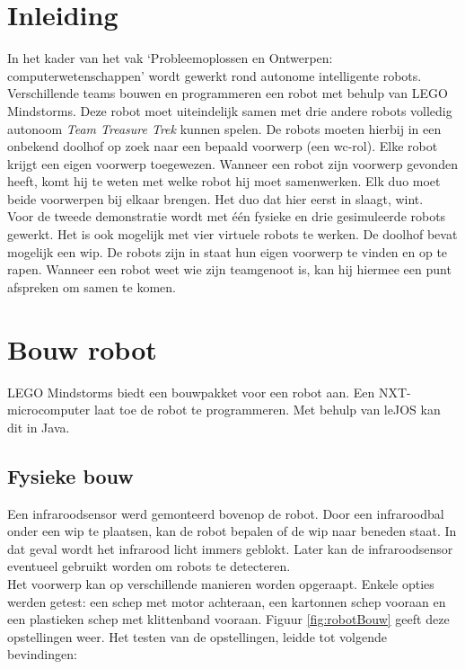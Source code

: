 \documentclass[tt2]{penoverslag}
\begin{document}
\newpage


\section{Inleiding} %
\label{ssec:inl}
In het kader van het vak `Probleemoplossen en Ontwerpen: computerwetenschappen' wordt gewerkt rond autonome intelligente robots. Verschillende teams bouwen en programmeren een robot met behulp van LEGO Mindstorms. Deze robot moet uiteindelijk samen met drie andere robots volledig autonoom \textit{Team Treasure Trek} kunnen spelen.
De robots moeten hierbij in een onbekend doolhof op zoek naar een bepaald voorwerp (een wc-rol). Elke robot krijgt een eigen voorwerp toegewezen. Wanneer een robot zijn voorwerp gevonden heeft, komt hij te weten met welke robot hij moet samenwerken. Elk duo moet beide voorwerpen bij elkaar brengen. Het duo dat hier eerst in slaagt, wint.\\

Voor de tweede demonstratie wordt met \'e\'en fysieke en drie gesimuleerde robots gewerkt. Het is ook mogelijk met vier virtuele robots te werken. De doolhof bevat mogelijk een wip. De robots zijn in staat hun eigen voorwerp te vinden en op te rapen. Wanneer een robot weet wie zijn teamgenoot is, kan hij hiermee een punt afspreken om samen te komen.\\


\section{Bouw robot}
\label{ssec:bouwrob}
LEGO Mindstorms biedt een bouwpakket voor een robot aan. Een NXT-microcomputer laat toe de robot te programmeren. Met behulp van leJOS kan dit in Java.

\subsection{Fysieke bouw}
\label{ssec:fysb}
Een infraroodsensor werd gemonteerd bovenop de robot. Door een infraroodbal onder een wip te plaatsen, kan de robot bepalen of de wip naar beneden staat. In dat geval wordt het infrarood licht immers geblokt. Later kan de infraroodsensor eventueel gebruikt worden om robots te detecteren.\\

Het voorwerp kan op verschillende manieren worden opgeraapt. Enkele opties werden getest: een schep met motor achteraan, een kartonnen schep vooraan en een plastieken schep met klittenband vooraan. Figuur \ref{fig:robotBouw} geeft deze opstellingen weer. Het testen van de opstellingen, leidde tot volgende bevindingen:
\end{document}
